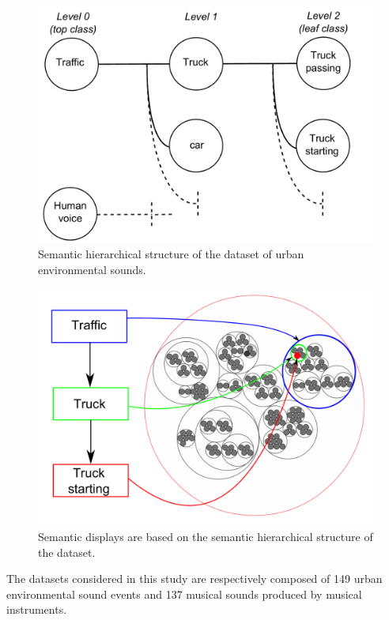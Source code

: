 \documentclass{aes2e}
\begin{document}
\begin{figure}[t]
\begin{center}
\includegraphics[scale=0.24]{gfx/dataset.pdf} 
\end{center}
\caption{\label{figdataset} Semantic hierarchical structure of the dataset of urban environmental sounds.}
\end{figure}

\begin{figure}[t]
\begin{center}
\includegraphics[scale=0.24]{gfx/SSF.pdf} 
\end{center}
\caption{\label{figSSF} Semantic displays are  based on the semantic hierarchical structure of the dataset.}
\end{figure}


The datasets considered in this study are respectively composed of 149 urban environmental sound events and 137 musical sounds produced by musical instruments. 
\end{document}
